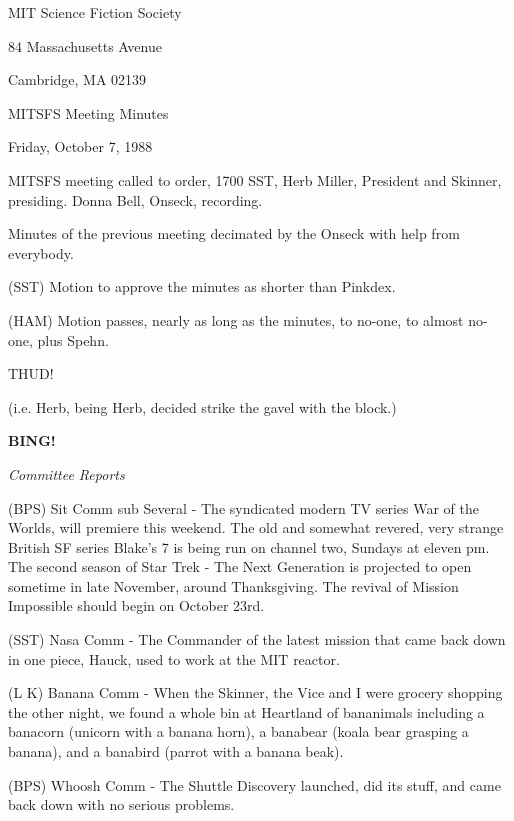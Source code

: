 \documentclass[12pt]{article}
\newcommand{\bing}{{\bf BING!} }
\newcommand{\goto}[1]{\bing \vskip 12pt \centerline{{\em{#1}}}}
\begin{document}
\begin{center}

MIT Science Fiction Society 

84 Massachusetts Avenue

Cambridge, MA 02139

\vspace{12pt}

MITSFS Meeting Minutes 

Friday, October 7, 1988

\end{center}
 
\vspace{18pt}

\setlength{\parskip}{6pt}

\noindent
MITSFS meeting called to order, 1700 SST, Herb Miller, President and Skinner, presiding. Donna Bell, Onseck, recording.

Minutes of the previous meeting decimated by the Onseck with help from everybody.

(SST) Motion to approve the minutes as shorter than Pinkdex.

(HAM) Motion passes, nearly as long as the minutes, to no-one, to almost no-one, plus Spehn.

THUD!

(i.e. Herb, being Herb, decided strike the gavel with the block.)

\goto{Committee Reports}

(BPS) Sit Comm sub Several - The syndicated modern TV series War of the Worlds, will premiere this weekend. The old and somewhat revered, very strange British SF series Blake's 7 is being run on channel two, Sundays at eleven pm. The second season of Star Trek - The Next Generation is projected to open sometime in late November, around Thanksgiving. The revival of Mission Impossible should begin on October 23rd.

(SST) Nasa Comm - The Commander of the latest mission that came back down in one piece, Hauck, used to work at the MIT reactor.

(L K) Banana Comm - When the Skinner, the Vice and I were grocery shopping the other night, we found a whole bin at Heartland of bananimals including a banacorn (unicorn with a banana horn), a banabear (koala bear grasping a banana), and a banabird (parrot with a banana beak).

(BPS) Whoosh Comm - The Shuttle Discovery launched, did its stuff, and came back down with no serious problems.
\end{document}
